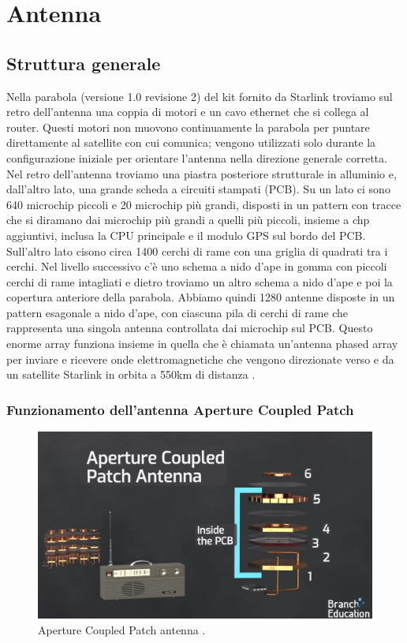 
\chapter{Antenna}

\section{Struttura generale}
Nella parabola (versione 1.0 revisione 2) del kit fornito da Starlink troviamo sul retro dell'antenna una coppia di motori e un cavo ethernet che si collega al router.
Questi motori non muovono continuamente la parabola per puntare direttamente al satellite con cui comunica; vengono utilizzati solo durante la configurazione iniziale per orientare l'antenna nella direzione generale corretta.
Nel retro dell'antenna troviamo una piastra posteriore strutturale in alluminio e, dall'altro lato, una grande scheda a circuiti stampati (PCB).
Su un lato ci sono 640 microchip piccoli e 20 microchip più grandi, disposti in un pattern con tracce che si diramano dai microchip più grandi a quelli più piccoli, insieme a chp aggiuntivi, inclusa la CPU principale e il modulo GPS sul bordo del PCB. Sull'altro lato cisono circa 1400 cerchi di rame con una griglia di quadrati tra i cerchi.
Nel livello successivo c'è uno schema a nido d'ape in gomma con piccoli cerchi di rame intagliati e dietro troviamo un altro schema a nido d'ape e poi la copertura anteriore della parabola.
Abbiamo quindi 1280 antenne disposte in un pattern esagonale a nido d'ape, con ciascuna pila di cerchi di rame che rappresenta una singola antenna controllata dai microchip sul PCB.
Questo enorme array funziona insieme in quella che è chiamata un'antenna phased array per inviare e ricevere onde elettromagnetiche che vengono direzionate verso e da un satellite Starlink in orbita a 550km di distanza \cite{branch_education_how_2022}.

\subsection{Funzionamento dell'antenna Aperture Coupled Patch}

\begin{figure}[htbp]
  \centering
  \includegraphics[width=0.8\linewidth]{./res/img/antenna_pcb.png}
  \caption{Aperture Coupled Patch antenna \cite{branch_education_how_2022}.}
  \label{fig:aperture-couple-patch-antenna}
\end{figure}

